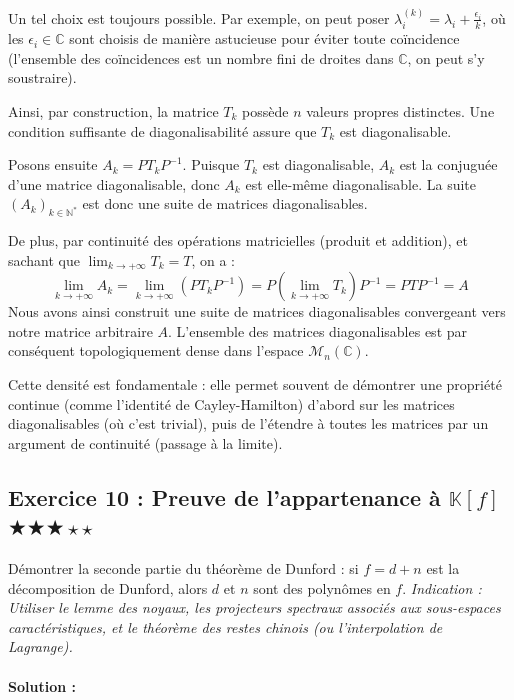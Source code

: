 \documentclass[11pt,a4paper]{article}
\begin{document}
Un tel choix est toujours possible. Par exemple, on peut poser $\lambda_{i}^{(k)} = \lambda_i + \frac{\epsilon_i}{k}$, où les $\epsilon_i \in \mathbb{C}$ sont choisis de manière astucieuse pour éviter toute coïncidence (l'ensemble des coïncidences est un nombre fini de droites dans $\mathbb{C}$, on peut s'y soustraire).

Ainsi, par construction, la matrice $T_k$ possède $n$ valeurs propres distinctes.
Une condition suffisante de diagonalisabilité assure que $T_k$ est diagonalisable.

Posons ensuite $A_k = P T_k P^{-1}$.
Puisque $T_k$ est diagonalisable, $A_k$ est la conjuguée d'une matrice diagonalisable, donc $A_k$ est elle-même diagonalisable.
La suite $(A_k)_{k \in \mathbb{N}^*}$ est donc une suite de matrices diagonalisables.

De plus, par continuité des opérations matricielles (produit et addition), et sachant que $\lim_{k \to +\infty} T_k = T$, on a :
$$ \lim_{k \to +\infty} A_k = \lim_{k \to +\infty} (P T_k P^{-1}) = P \left( \lim_{k \to +\infty} T_k \right) P^{-1} = P T P^{-1} = A $$
Nous avons ainsi construit une suite de matrices diagonalisables convergeant vers notre matrice arbitraire $A$.
L'ensemble des matrices diagonalisables est par conséquent topologiquement dense dans l'espace $\mathcal{M}_n(\mathbb{C})$.

Cette densité est fondamentale : elle permet souvent de démontrer une propriété continue (comme l'identité de Cayley-Hamilton) d'abord sur les matrices diagonalisables (où c'est trivial), puis de l'étendre à toutes les matrices par un argument de continuité (passage à la limite).

\vspace{1cm}
\subsection*{Exercice 10 : Preuve de l'appartenance à $\mathbb{K}[f]$ $\bigstar\bigstar\bigstar\star\star$}

Démontrer la seconde partie du théorème de Dunford : si $f = d + n$ est la décomposition de Dunford, alors $d$ et $n$ sont des polynômes en $f$.
\textit{Indication : Utiliser le lemme des noyaux, les projecteurs spectraux associés aux sous-espaces caractéristiques, et le théorème des restes chinois (ou l'interpolation de Lagrange).}

\paragraph*{Solution :}
\end{document}
